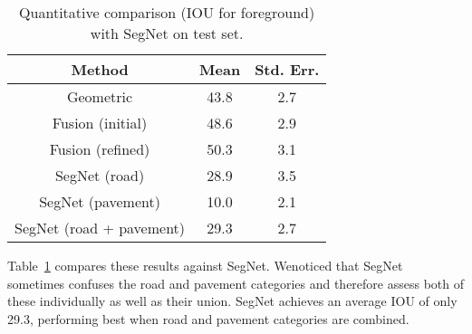 \documentclass[10pt,twocolumn,letterpaper]{article}
\begin{document}
\begin{table}
\begin{center}
\caption{Quantitative comparison (IOU for foreground) with SegNet on test set.}
\begin{tabular}{|c|c|c|}
\hline
Method & Mean & Std. Err.\\
\hline
Geometric & 43.8 & 2.7 \\
Fusion (initial) & 48.6 & 2.9 \\
Fusion (refined) & 50.3 & 3.1 \\
SegNet (road) & 28.9 & 3.5 \\
SegNet (pavement) & 10.0 & 2.1 \\
SegNet (road + pavement) & 29.3 & 2.7 \\
\hline
\end{tabular}
\end{center}
\label{Tab:experiment}
\end{table}
Table~\ref{Tab:experiment} compares these results against SegNet. Wenoticed that SegNet sometimes confuses the road and pavement categories and therefore assess both of these individually as well as their union. SegNet achieves an average IOU of only 29.3, performing best when road and pavement categories are combined\cite{Almazan2016Road}.

\end{document}
